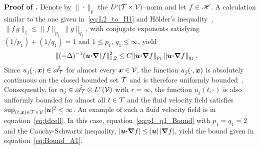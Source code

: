 \documentclass[amsa]{ipart}
\begin{document}
\textbf{Proof of .}\hspace{1ex}
%
Denote by $\|\cdot\|_p$ the $L^p(\mathcal{T}\times\mathcal{V})$--norm and let $f\in\mathscr{H}$. A
calculation similar to the one given 
in~\eqref{eq:L2_to_H1} and H{\"o}lder's
inequality~\cite{Folland:99:RealAnalysis}, 
$\|f\,g\|_1\leq\|f\|_{p_1}\,\|g\|_{q_1}$, with conjugate exponents
satisfying $(1/p_1)+(1/q_1)=1$ and $1\leq p_1,\,q_1\leq\infty$, yield
%
\begin{align}\label{eq:p1_q1_Bound}
  \|(-\Delta)^{-1}(\vecu\bcdot\bnabla)f\|^2_{1,2}
  &\leq C\|\vecu\bcdot\bnabla f\|_{p_1}\,\|\vecu\bcdot\bnabla f\|_{q_1}\,.
\end{align}
%
Since $u_j(\cdot,\boldsymbol{x})\in\tilde{\mathscr{A}}_{\mathcal{T}}$ for almost every $\boldsymbol{x}\in\mathcal{V}$,
the function $u_j(\cdot,\boldsymbol{x})$ is absolutely continuous on 
the closed bounded set $\mathcal{T}$ and is therefore uniformly
bounded~\cite{Royden:1988:RA,BabyRudin:64}. Consequently, for
$u_j\in\tilde{\mathscr{A}}_{\mathcal{T}}\otimes L^r(\mathcal{V})$ with $r=\infty$, the function $u_j(t,\cdot)$ is also
uniformly bounded for almost all $t\in\mathcal{T}$ and the fluid 
velocity field satisfies $\sup_{(t,\boldsymbol{x})\in\mathcal{T}\times\mathcal{V}}|\boldsymbol{u}|^2<\infty$. An
example of such a fluid velocity field is in
equation~\eqref{eq:tdcell}. In this case,
equation~\eqref{eq:p1_q1_Bound} with 
$p_1=q_1=2$ and the Cauchy-Schwartz inequality,
$|\boldsymbol{u}\mbox{\boldmath${\cdot}$}\mbox{\boldmath${\nabla}$} f|\leq|\boldsymbol{u}|\,|\mbox{\boldmath${\nabla}$} f|$, yield the bound given in 
equation~\eqref{eq:Bound_A1}.
\end{document}
